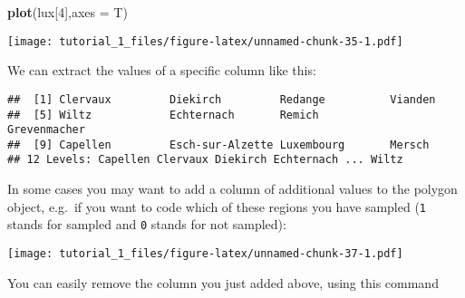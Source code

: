 \documentclass[]{article}
\newenvironment{Shaded}{\begin{snugshade}}{\end{snugshade}}
\newcommand{\DataTypeTok}[1]{\textcolor[rgb]{0.13,0.29,0.53}{#1}}
\newcommand{\DecValTok}[1]{\textcolor[rgb]{0.00,0.00,0.81}{#1}}
\newcommand{\KeywordTok}[1]{\textcolor[rgb]{0.13,0.29,0.53}{\textbf{#1}}}
\newcommand{\NormalTok}[1]{#1}
\newcommand{\OperatorTok}[1]{\textcolor[rgb]{0.81,0.36,0.00}{\textbf{#1}}}
\newcommand{\StringTok}[1]{\textcolor[rgb]{0.31,0.60,0.02}{#1}}
\begin{document}
\begin{Shaded}
\begin{Highlighting}[]
\KeywordTok{plot}\NormalTok{(lux[}\DecValTok{4}\NormalTok{],}\DataTypeTok{axes =}\NormalTok{ T)}
\end{Highlighting}
\end{Shaded}

\texttt{[image: tutorial\_1\_files/figure-latex/unnamed-chunk-35-1.pdf]}

We can extract the values of a specific column like this:

\begin{Shaded}
\end{Shaded}

\begin{verbatim}
##  [1] Clervaux         Diekirch         Redange          Vianden         
##  [5] Wiltz            Echternach       Remich           Grevenmacher    
##  [9] Capellen         Esch-sur-Alzette Luxembourg       Mersch          
## 12 Levels: Capellen Clervaux Diekirch Echternach ... Wiltz
\end{verbatim}

In some cases you may want to add a column of additional values to the
polygon object, e.g.~if you want to code which of these regions you have
sampled (\texttt{1} stands for sampled and \texttt{0} stands for not
sampled):

\begin{Shaded}
\end{Shaded}

\texttt{[image: tutorial\_1\_files/figure-latex/unnamed-chunk-37-1.pdf]}

You can easily remove the column you just added above, using this
command
\end{document}
